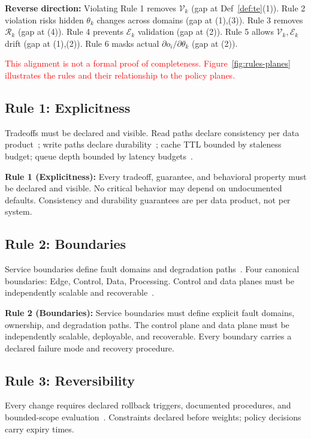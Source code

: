 \documentclass[conference]{IEEEtran}
\newcommand{\majorrule}[2]{%
    \vspace{0.5em}\noindent\textbf{\textcolor{rulecolor}{Rule #1:}} #2\par\vspace{0.5em}}
\begin{document}
{\color{red}
\textbf{Reverse direction:} Violating Rule 1 removes $\mathcal{V}_k$ (gap at Def~\ref{def:te}(1)). Rule 2 violation risks hidden $\theta_k$ changes across domains (gap at (1),(3)). Rule 3 removes $\mathcal{R}_k$ (gap at (4)). Rule 4 prevents $\mathcal{E}_k$ validation (gap at (2)). Rule 5 allows $\mathcal{V}_k,\mathcal{E}_k$ drift (gap at (1),(2)). Rule 6 masks actual $\partial o_i/\partial \theta_k$ (gap at (2)).

\textcolor{red}{
This alignment is not a formal proof of completeness. Figure~\ref{fig:rules-planes} illustrates the rules and their relationship to the policy planes.}

{\color{red}
\subsection{Rule 1: Explicitness}
Tradeoffs must be declared and visible. Read paths declare consistency per data product~\cite{dynamo}; write paths declare durability~\cite{raft}; cache TTL bounded by staleness budget; queue depth bounded by latency budgets~\cite{kafka}.}

\majorrule{1 (Explicitness)}{Every tradeoff, guarantee, and behavioral property must be declared and visible. No critical behavior may depend on undocumented defaults. Consistency and durability guarantees are per data product, not per system.}

{\color{red}
\subsection{Rule 2: Boundaries}
Service boundaries define fault domains and degradation paths~\cite{parnas1972criteria}. Four canonical boundaries: Edge, Control, Data, Processing. Control and data planes must be independently scalable and recoverable~\cite{bigtable}.}

\majorrule{2 (Boundaries)}{Service boundaries must define explicit fault domains, ownership, and degradation paths. The control plane and data plane must be independently scalable, deployable, and recoverable. Every boundary carries a declared failure mode and recovery procedure.}

{\color{red}
\subsection{Rule 3: Reversibility}
Every change requires declared rollback triggers, documented procedures, and bounded-scope evaluation~\cite{sre}. Constraints declared before weights; policy decisions carry expiry times.}

}
\end{document}
